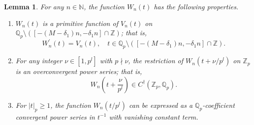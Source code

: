 \documentclass[12pt]{article}
\newtheorem{lemma}[theorem]{Lemma}
\numberwithin{equation}{section}
\begin{document}
\begin{lemma}\label{prop_of_W_n(t)}
For any $n \in \mathbb{N}$, the function $W_n(t)$ has the following properties.
\begin{enumerate}
\item[(1)] $W_n(t)$ is a primitive function of $V_n(t)$ on $\mathbb{Q}_p \setminus \left( [-(M-\delta_1)n, -\delta_1n] \cap \mathbb{Z} \right)$; that is,
\[ W_n^{\prime}(t) = V_n(t), \quad t \in \mathbb{Q}_p \setminus \left( [-(M-\delta_1)n, -\delta_1n] \cap \mathbb{Z} \right). \]

\item[(2)] For any integer $\nu \in [1,p^{l}]$ with $p \nmid \nu$, the restriction of $W_n(t+\nu/p^{l})$ on $\mathbb{Z}_p$ is an overconvergent power series; that is,
\[ W_n\left( t+\frac{\nu}{p^{l}} \right)  \in C^\dagger(\mathbb{Z}_p,\mathbb{Q}_p). \]

\item[(3)] For $|t|_p \geqslant 1$, the function $W_n(t/p^{l})$ can be expressed as a $\mathbb{Q}_p$-coefficient convergent power series in $t^{-1}$ with vanishing constant term.
\end{enumerate}
\end{lemma}
\end{document}
